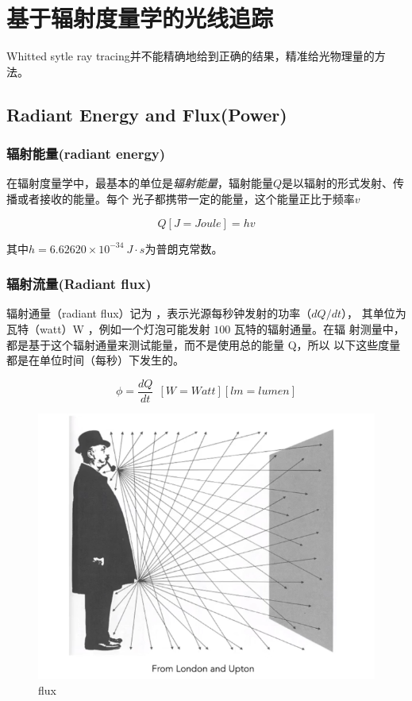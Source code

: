 \chapter{基于辐射度量学的光线追踪}

Whitted sytle ray tracing并不能精确地给到正确的结果，精准给光物理量的方法。

\section{Radiant Energy and Flux(Power)}

\subsection*{辐射能量(radiant energy)}
在辐射度量学中，最基本的单位是\textsl{辐射能量}，辐射能量$Q$是以辐射的形式发射、传播或者接收的能量。每个
光子都携带一定的能量，这个能量正比于频率$v$

\begin{equation}
    Q[J=Joule]=hv
\end{equation}

其中$h=6.62620\times 10^{-34}\ J\cdot s$为普朗克常数。

\subsection*{辐射流量(Radiant flux)}

辐射通量（radiant flux）记为 ，表示光源每秒钟发射的功率（$dQ/dt$），
其单位为瓦特（watt）W ，例如一个灯泡可能发射 $100$ 瓦特的辐射通量。在辐
射测量中，都是基于这个辐射通量来测试能量，而不是使用总的能量 Q，所以
以下这些度量都是在单位时间（每秒）下发生的。

\begin{equation}
    \phi=\frac{dQ}{dt}\ \ [W=Watt][lm=lumen]
\end{equation}

\begin{figure}[H]
    \centering
    \includegraphics[scale=0.4]{figures/flux.png}
    \caption{flux}
\end{figure}


